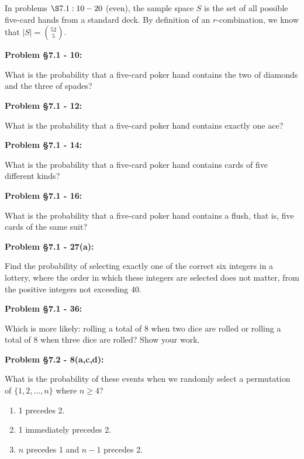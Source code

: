 \documentclass{article}
\newenvironment{problem}[1]
    {\begin{mdframed}[default]
    \textbf{Problem #1:}
    }
    {\end{mdframed}
    }
\begin{document}
\noindent In problems $\S 7.1: 10-20$ (even), the sample space $S$ is the set of all possible five-card hands from a standard deck. By definition of an $r$-combination, we know that $|S| = {52 \choose 5}$.

\begin{problem}{\S 7.1 - 10}
What is the probability that a five-card poker hand contains the two of diamonds and the three of spades?
\end{problem}

\begin{problem}{\S 7.1 - 12}
What is the probability that a five-card poker hand contains exactly one ace?
\end{problem}

\begin{problem}{\S 7.1 - 14}
What is the probability that a five-card poker hand contains cards of five different kinds?
\end{problem}

\begin{problem}{\S 7.1 - 16}
What is the probability that a five-card poker hand contains a flush, that is, five cards of the same suit?
\end{problem}

\begin{problem}{\S 7.1 - 27(a)}
Find the probability of selecting exactly one of the correct six integers in a lottery, where the order in which these integers are selected does not matter, from the positive integers not exceeding 40.
\end{problem}

\begin{problem}{\S 7.1 - 36}
Which is more likely: rolling a total of 8 when two dice are rolled or rolling a total of 8 when three dice are rolled? Show your work.
\end{problem}

\begin{problem}{\S 7.2 - 8(a,c,d)}
What is the probability of these events when we randomly select a permutation of $\{ 1, 2, \dots, n \}$ where $n \geq 4$?
\begin{enumerate}
    \item[(a)] 1 precedes 2.
    \item[(c)] 1 immediately precedes 2.
    \item[(d)] $n$ precedes 1 and $n-1$ precedes 2.
\end{enumerate}
\end{problem}
\end{document}
